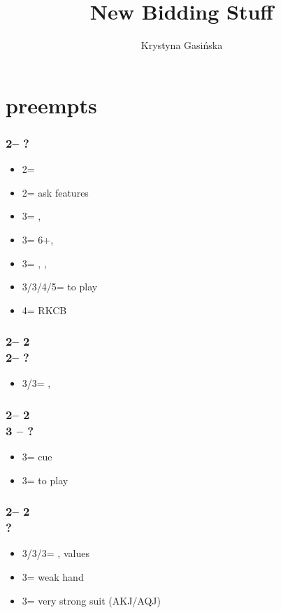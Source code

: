 \documentclass[12pt, a4paper]{article}
\title{New Bidding Stuff}
\author{Krystyna Gasińska}
\begin{document}
\maketitle

\section{\major preempts}

\subsubsection*{2\hearts -- ?}
\begin{itemize}
    \item 2\spades = \lsf
    \item 2\nt = ask \nt features
    \item 3\clubs = \minor, \gf
    \item 3\diams = 6+\spades, \invp \vimp
    \item 3\spades = \spades, \inv, \nf
    \item 3\hearts/3\nt/4\major/5\minor = to play
    \item 4\clubs = RKCB
\end{itemize}

\subsubsection*{2\hearts -- 2\spades\\
                2\nt -- ?}
\begin{itemize}
    \item 3\clubs/3\diams = \nat, \inv
\end{itemize}

\subsubsection*{2\hearts -- 2\spades\\
                3 -- ?}
\begin{itemize}
    \item 3\spades = cue
    \item 3\nt = to play
\end{itemize}

\subsubsection*{2\hearts -- 2\nt\\
                ?}
\begin{itemize}
    \item 3\clubs/3\diams/3\spades = \nat, \nt values
    \item 3\hearts = weak hand
    \item 3\nt = very strong suit (AKJ/AQJ)
\end{itemize}
\end{document}
